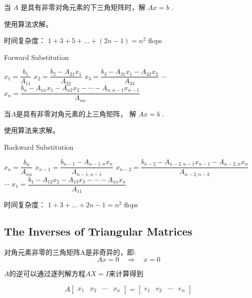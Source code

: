 \begin{problem}
    当 $ A $ 是具有非零对角元素的下三角矩阵时，解 $ A x=b $ .
\end{problem}

使用算法求解。

时间复杂度： $ 1+3+5+\ldots+(2  {n}-1)= {n}^{2} $ flops

\begin{algorithm}[htbp]
    \caption{Forward Substitution}
    $ x_{1}= \dfrac{b_{1} }{A_{11} }  $\;
$ x_{2}=\dfrac{b_{2}-A_{21} x_{1}}{A_{22}}$\;
$  x_{3} =\dfrac{b_{3}-A_{31} x_{1}-A_{32} x_{2}}{A_{33}} $ \;
    $\cdots$  \;
    $x_{n} =
    \dfrac{b_{n}-A_{n 1} x_{1}-A_{n 2} x_{2}-\cdots-A_{n, n-1} x_{n-1}}{A_{n n}} $\;
\end{algorithm}

\begin{problem}
    当$A$是具有非零对角元素的上三角矩阵， 解 $  {A} x= {b} $ .
\end{problem}

使用算法来求解。

\begin{algorithm}[htbp]
    \caption{Backward Substitution}
    $ x_{n}= \dfrac{b_{n}}{A_{n n}} $\;
    $ x_{n-1}= \dfrac{b_{n-1}-A_{n-1, n} x_{n}}{A_{n-1, n-1}} $ \;
    $ x_{n-2}= \dfrac{b_{n-2}-A_{n-2, n-1} x_{n-1}-A_{n-2, n} x_{n}}{ A_{n-2, n-2}} $\;
    $\cdots$\;
    $ x_{1}=\dfrac{b_{1}-A_{12} x_{2}-A_{13} x_{3}-\cdots-A_{1 n} x_{n}}{A_{11}}  $\;
\end{algorithm}

时间复杂度： $ 1+3+\ldots+2  {n}-1= {n}^{2} $ flops

\subsection{The Inverses of Triangular Matrices}

\begin{theorem}
    对角元素非零的三角矩阵A是非奇异的，即:
\begin{equation}
A x=0 \quad \Rightarrow \quad x=0
\end{equation}
\end{theorem}

\begin{theorem}[高斯消元法]
    $A$的逆可以通过逐列解方程$AX=I$来计算得到

    \begin{equation} A\left[\begin{array}{llll}x_{1} & x_{2} & \cdots & x_{n}\end{array}\right]=\left[\begin{array}{llll}e_{1} & e_{2} & \cdots & e_{n}\end{array}\right] \end{equation}
\end{theorem}

